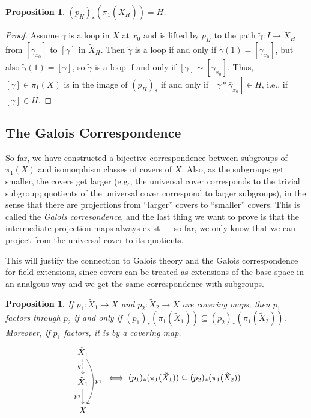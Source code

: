 \documentclass{article}
\newtheorem{prop}[thm]{Proposition}
\theoremstyle{definition}
\theoremstyle{remark}
\numberwithin{figure}{section}
\begin{document}
\begin{prop}
	$(p_H)_*(\pi_1(\tilde X_H)) = H$.
\end{prop}

\begin{proof}
	Assume $\gamma$ is a loop in $X$ at $x_0$ and is lifted by $p_H$ to the path $\tilde\gamma : I \to \tilde X_H$ from $[\gamma_{x_0}]$ to $[\gamma]$ in $\tilde X_H$. Then $\tilde\gamma$ is a loop if and only if $\tilde\gamma(1) = [\gamma_{x_0}]$, but also $\tilde\gamma(1) = [\gamma]$, so $\tilde\gamma$ is a loop if and only if $[\gamma] \sim [\gamma_{x_0}]$. Thus, $[\gamma] \in \pi_1(X)$ is in the image of $(p_H)_*$ if and only if $[\gamma * \bar\gamma_{x_0}] \in H$, i.e., if $[\gamma] \in H$.
\end{proof}

\subsection{The Galois Correspondence}
So far, we have constructed a bijective correspondence between subgroups of $\pi_1(X)$ and isomorphism classes of covers of $X$. Also, as the subgroups get smaller, the covers get larger (e.g., the universal cover corresponds to the trivial subgroup; quotients of the universal cover correspond to larger subgroups), in the sense that there are projections from ``larger'' covers to ``smaller'' covers. This is called the \emph{Galois corresondence}, and the last thing we want to prove is that the intermediate projection maps always exist --- so far, we only know that we can project from the universal cover to its quotients.

This will justify the connection to Galois theory and the Galois correspondence for field extensions, since covers can be treated as extensions of the base space in an analgous way and we get the same correspondence with subgroups.

\begin{prop}
	If $p_1 : \tilde X_1 \to X$ and $p_2 : \tilde X_2 \to X$ are covering maps, then $p_1$ factors through $p_2$ if and only if $(p_1)_*(\pi_1(\tilde X_1)) \subseteq (p_2)_*(\pi_1(\tilde X_2))$. Moreover, if $p_1$ factors, it is by a covering map.
	\[
	\begin{tikzcd}
		\tilde X_1 \ar[d, dashed, "q"'] \ar[dd, bend left, "p_1"]\\
		\tilde X_1 \ar[d, "p_2"']\\
		X
	\end{tikzcd} \iff (p_1)_*(\pi_1(\tilde X_1)) \subseteq (p_2)_*(\pi_1(\tilde X_2))
	\]
\end{prop}
\end{document}
